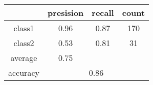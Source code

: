 
    \begin{tabular}{ | c | c | c | c | }
	\hline
	         &presision & recall & count \\ \hline
	class1   & 0.96    & 0.87  & 170 \\ \hline
	class2   & 0.53    & 0.81  & 31 \\ \hline
	average  & 0.75    &        &       \\
	\hline
	accuracy & \multicolumn{3}{c|}{0.86}\\
	\hline
    \end{tabular}